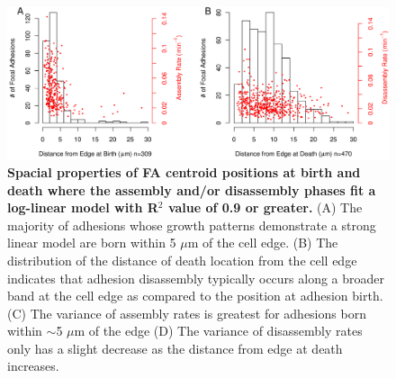 \begin{figure}[htbp]
\begin{center}
\includegraphics[width=\textwidth]{../figures/spatial/spatial_alt}
\end{center}
\caption{
{\bf Spacial properties of FA centroid positions at birth and death where the
assembly and/or disassembly phases fit a log-linear model with R$^2$ value of
0.9 or greater.} (A) The majority of adhesions whose growth patterns demonstrate
a strong linear model are born within 5 $\mu$m of the cell edge. (B) The
distribution of the distance of death location from the cell edge indicates that
adhesion disassembly typically occurs along a broader band at the cell edge as
compared to the position at adhesion birth. (C) The variance of assembly rates
is greatest for adhesions born within $\sim$5 $\mu$m of the edge (D) The
variance of disassembly rates only has a slight decrease as the distance from
edge at death increases.  
}
\label{spatial_alt}
\end{figure}

